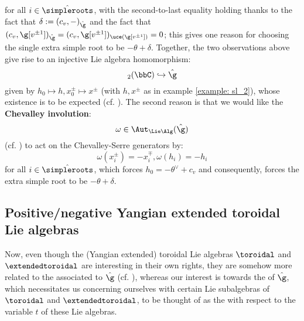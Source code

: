         for all $i \in \hat{\simpleroots}$, with the second-to-last equality holding thanks to the fact that $\delta := (c_v, -)_{\hat{\g}}$ and the fact that $(c_v, \g[v^{\pm 1}])_{\hat{\g}} = (c_v, \g[v^{\pm 1}])_{\uce(\g[v^{\pm 1}])} = 0$; this gives one reason for choosing the single extra simple root to be $-\theta + \delta$. Together, the two observations above give rise to an injective Lie algebra homomorphism:
            $$\sl_2(\bbC) \hookrightarrow \hat{\g}$$
        given by $h_0 \mapsto h, x_0^{\pm} \mapsto x^{\pm}$ (with $h, x^{\pm}$ as in example \ref{example: sl_2}), whose existence is to be expected (cf. \cite[Section 3.3]{kac_infinite_dimensional_lie_algebras}). The second reason is that we would like the \textbf{Chevalley involution}:
            $$\omega \in \Aut_{\Lie\Alg}(\hat{\g})$$
        (cf. \cite[p. 7]{kac_infinite_dimensional_lie_algebras}) to act on the Chevalley-Serre generators by:
            $$\omega(x_i^{\pm}) = -x_i^{\mp}, \omega(h_i) = -h_i$$
        for all $i \in \hat{\simpleroots}$, which forces $h_0 = -\theta^{\vee} + c_v$ and consequently, forces the extra simple root to be $-\theta + \delta$.

    \subsection{Positive/negative Yangian extended toroidal Lie algebras}
        Now, even though the  (Yangian extended) toroidal Lie algebras $\toroidal$ and $\extendedtoroidal$ are interesting in their own rights, they are somehow more related to the  associated to $\hat{\g}$ (cf. \cite[Subsection 2.3 and Section 6]{wendlandt_formal_shift_operators_on_yangian_doubles}), whereas our interest is towards the  of $\hat{\g}$, which necessitates us concerning ourselves with certain Lie subalgebras of $\toroidal$ and $\extendedtoroidal$, to be thought of as the  with respect to the variable $t$ of these Lie algebras. 


